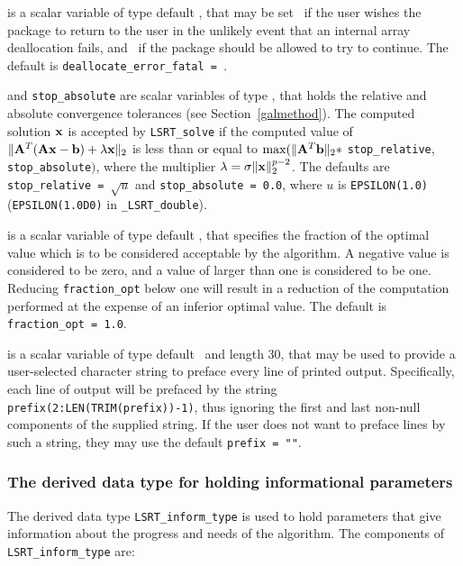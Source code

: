 \documentclass{galahad}
\newcommand{\packagename}{LS\-RT}
\newcommand{\fullpackagename}{\libraryname\_\packagename}
\begin{document}
\begin{description}
 is a scalar variable of type default \logical,
that may be set \true\ if the user wishes the package to return to the user
in the unlikely event that an internal array deallocation fails,
and \false\ if the package should be allowed to try to continue.
The default is {\tt deallocate\_error\_fatal = \false}.

 and {\tt stop\_absolute} are scalar variables of type
\realdp, that holds the
relative and absolute convergence tolerances (see Section~\ref{galmethod}).
The computed solution ${\mathbf{x}}$ is accepted by {\tt \packagename\_solve}
if the computed value of
$\|{\mathbf{A}}^T ( {\mathbf{A}} {\mathbf{x}} - {\mathbf{b}} ) + \lambda {\mathbf{x}}\|_2$
is less than or equal
to $\max (\| {\mathbf{A}}^T {\mathbf{b}} \|_2 \ast$ {\tt stop\_relative},
{\tt stop\_absolute}$)$, where the multiplier
$\lambda = \sigma \|{\mathbf{x}}\|_2^{p-2}$.
The defaults are {\tt stop\_relative = $\sqrt{u}$} and
{\tt stop\_absolute = 0.0},
where $u$ is {\tt EPSILON(1.0)} ({\tt EPSILON(1.0D0)} in
{\tt \fullpackagename\_double}).

 is a scalar variable of type default
\realdp, that specifies the fraction
of the optimal value which is to be considered acceptable by the algorithm.
A negative value is considered to be zero, and a value of larger than one
is considered to be one. Reducing {\tt fraction\_opt} below one will result
in a reduction of the computation performed at the expense of an inferior
optimal value.
The default is {\tt fraction\_opt = 1.0}.

 is a scalar variable of type default \character\
and length 30, that may be used to provide a user-selected
character string to preface every line of printed output.
Specifically, each line of output will be prefaced by the string
{\tt prefix(2:LEN(TRIM(prefix))-1)},
thus ignoring the first and last non-null components of the
supplied string. If the user does not want to preface lines by such
a string, they may use the default {\tt prefix = ""}.

\end{description}


\subsubsection{The derived data type for holding informational
 parameters}\label{typeinform}
The derived data type
{\tt \packagename\_inform\_type}
is used to hold parameters that give information about the progress and needs
of the algorithm. The components of
{\tt \packagename\_inform\_type}
are:
\end{document}
